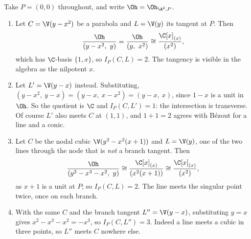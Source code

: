 \begin{example}\label{ex:intmultcomputations}
	Take $P = (0,0)$ throughout, and write $\Oh = \Oh_{\A^2,P}$.
	\begin{enumerate}[label=(\roman*)]
		\item Let $C = \V(y - x^2)$ be a parabola and $L = \V(y)$ its tangent at $P$. Then
		$$\frac{\Oh}{(y-x^2,\ y)} = \frac{\Oh}{(y,\ x^2)} \cong \frac{\C[x]_{(x)}}{(x^2)},$$
		which has $\C$-basis $\{1,x\}$, so $I_P(C,L) = 2$. The tangency is visible in the algebra as the nilpotent $x$.
		\item Let $L' = \V(y - x)$ instead. Substituting, $(y-x^2,\ y-x) = (y-x,\ x - x^2) = (y-x,\ x)$, since $1-x$ is a unit in $\Oh$. So the quotient is $\C$ and $I_P(C,L') = 1$: the intersection is transverse. Of course $L'$ also meets $C$ at $(1,1)$, and $1 + 1 = 2$ agrees with B\'ezout for a line and a conic.
		\item Let $C$ be the nodal cubic $\V(y^2 - x^2(x+1))$ and $L = \V(y)$, one of the two lines through the node that is \emph{not} a branch tangent. Then
		$$\frac{\Oh}{(y^2-x^3-x^2,\ y)} \cong \frac{\C[x]_{(x)}}{(x^2(x+1))} \cong \frac{\C[x]_{(x)}}{(x^2)},$$
		as $x+1$ is a unit at $P$; so $I_P(C,L) = 2$. The line meets the singular point twice, once on each branch.
		\item With the same $C$ and the branch tangent $L'' = \V(y-x)$, substituting $y = x$ gives $x^2 - x^3 - x^2 = -x^3$, so $I_P(C,L'') = 3$. Indeed a line meets a cubic in three points, so $L''$ meets $C$ nowhere else.
	\end{enumerate}
\end{example}

\begin{center}
\end{center}

